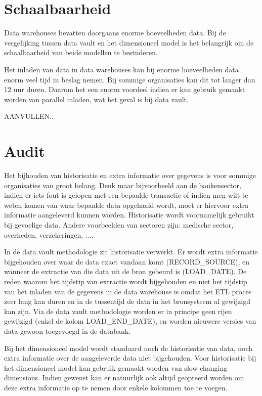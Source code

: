 \section{Schaalbaarheid}
Data warehouses bevatten doorgaans enorme hoeveelheden data. Bij de vergelijking tussen data vault en het dimensioneel model is het belangrijk om de schaalbaarheid van beide modellen te bestuderen. 

Het inladen van data in data warehouses kan bij enorme hoeveelheden data enorm veel tijd in beslag nemen. Bij sommige organisaties kan dit tot langer dan 12 uur duren. Daarom het een enorm voordeel indien er kan gebruik gemaakt worden van parallel inladen, wat het geval is bij data vault. 

AANVULLEN..


\section{Audit}
Het bijhouden van historisatie en extra informatie over gegevens is voor sommige organisaties van groot belang. Denk maar bijvoorbeeld aan de bankensector, indien er iets fout is gelopen met een bepaalde transactie of indien men wilt te weten komen van waar bepaalde data opgehaald wordt, moet er hiervoor extra informatie aangeleverd kunnen worden. Historisatie wordt voornamelijk gebruikt bij gevoelige data. Andere voorbeelden van sectoren zijn: medische sector, overheden, verzekeringen, ....

In de data vault methodologie zit historisatie verwerkt. Er wordt extra informatie bijgehouden over waar de data exact vandaan komt (RECORD\_SOURCE), en wanneer de extractie van die data uit de bron gebeurd is (LOAD\_DATE). De reden waarom het tijdstip van extractie wordt bijgehouden en niet het tijdstip van het inladen van de gegevens in de data warehouse is omdat het ETL proces zeer lang kan duren en in de tussentijd de data in het bronsysteem al gewijzigd kan zijn. Via de data vault methodologie worden er in principe geen rijen gewijzigd (enkel de kolom LOAD\_END\_DATE), en worden nieuwere versies van data gewoon toegevoegd in de databank.

Bij het dimensioneel model wordt standaard noch de historisatie van data, noch extra informatie over de aangeleverde data niet bijgehouden. Voor historisatie bij het dimensioneel model kan gebruik gemaakt worden van slow changing dimensions. Indien gewenst kan er natuurlijk ook altijd geopteerd worden om deze extra informatie op te nemen door enkele kolommen toe te voegen. 

